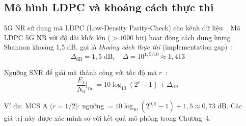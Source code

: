 \subsection{Mô hình LDPC và khoảng cách thực thi}

5G NR sử dụng mã LDPC (Low-Density Parity-Check) cho kênh dữ liệu~\cite{ts38212}. Mã LDPC 5G NR với độ dài khối lớn ($> 1000$ bit) hoạt động cách dung lượng Shannon khoảng 1{,}5 dB, gọi là \textit{khoảng cách thực thi} (implementation gap)~\cite{richardson2008}:
\begin{equation}\label{eq:ldpc_gap}
    \Delta_{\text{dB}} = 1{,}5 \text{ dB}, \quad \Delta = 10^{1{,}5/10} \approx 1{,}413
\end{equation}

Ngưỡng SNR để giải mã thành công với tốc độ mã $r$~\cite{richardson2008}:
\begin{equation}\label{eq:snr_thr}
    \frac{E_s}{N_0}\bigg|_{\text{thr}} = 10\log_{10}(2^r - 1) + \Delta_{\text{dB}}
\end{equation}

Ví dụ: MCS A ($r = 1/2$): ngưỡng $= 10\log_{10}(2^{0{,}5}-1) + 1{,}5 \approx 0{,}73$ dB. Các giá trị này được xác minh so với kết quả mô phỏng trong Chương~4.
